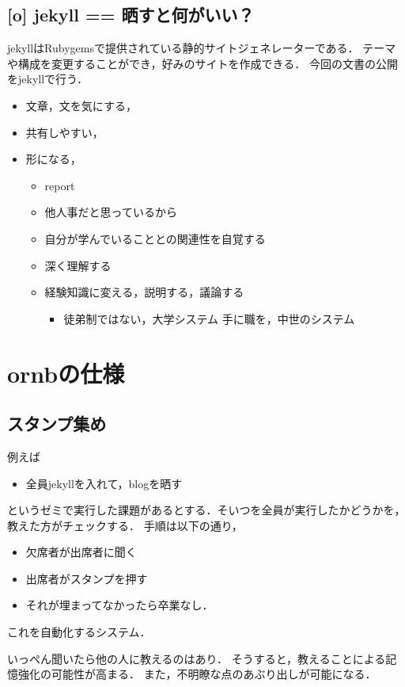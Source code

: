 \documentclass{hissymp}
\begin{document}
\subsection{[o] jekyll == 晒すと何がいい？}
\label{sec:orgc293f4d}
jekyllはRubygemsで提供されている静的サイトジェネレーターである．
テーマや構成を変更することができ，好みのサイトを作成できる．
今回の文書の公開をjekyllで行う．
\begin{itemize}
\item 文章，文を気にする，
\item 共有しやすい，
\item 形になる，
\begin{itemize}
\item report
\item 他人事だと思っているから
\item 自分が学んでいることとの関連性を自覚する
\item 深く理解する
\item 経験知識に変える，説明する，議論する
\begin{itemize}
\item 徒弟制ではない，大学システム
手に職を，中世のシステム
\end{itemize}
\end{itemize}
\end{itemize}

\section{ornbの仕様}
\label{sec:org2b42e2c}
\subsection{スタンプ集め}
\label{sec:org0b1335b}
例えば
\begin{itemize}
\item 全員jekyllを入れて，blogを晒す
\end{itemize}
というゼミで実行した課題があるとする．そいつを全員が実行したかどうかを，教えた方がチェックする．
手順は以下の通り，
\begin{itemize}
\item 欠席者が出席者に聞く
\item 出席者がスタンプを押す
\item それが埋まってなかったら卒業なし．
\end{itemize}
これを自動化するシステム．

いっぺん聞いたら他の人に教えるのはあり．
そうすると，教えることによる記憶強化の可能性が高まる．
また，不明瞭な点のあぶり出しが可能になる．
\end{document}
